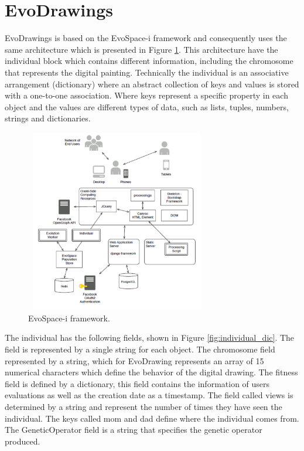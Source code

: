 \section{EvoDrawings}
EvoDrawings is based on the EvoSpace-i framework and consequently uses the same
architecture which is presented in Figure \ref{fig:ESFramework}. This
architecture have the individual block which contains different information,
including the chromosome that represents the digital painting. Technically the
individual is an associative arrangement (dictionary) where an abstract
collection of keys and values is stored with a one-to-one association. Where
keys represent a specific property in each object and the values are different
types of data, such as lists, tuples, numbers, strings and dictionaries.
\begin{figure}
\captionsetup{justification=centering,margin=2cm}
\centering
\setlength\fboxsep{0pt}
\setlength\fboxrule{0.7pt}
\includegraphics[width=8cm,height=8cm,keepaspectratio]{img/ESFramework.png}
\caption{EvoSpace-i framework.}
\label{fig:ESFramework}
\end{figure}


The individual has the following fields, shown in Figure \ref{fig:individual_dic}.
The field is represented by a single string for each object. The chromosome
field represented by a string, which for EvoDrawing represents an array of 15
numerical characters which define the behavior of the digital drawing. The
fitness field is defined by a dictionary, this field contains the information of
users evaluations as well as the creation date as a timestamp. The field called
views is determined by a string and represent the number of times they have seen
the individual. The keys called mom and dad define where the individual comes
from. The GeneticOperator field is a string that specifies the genetic operator
produced.

